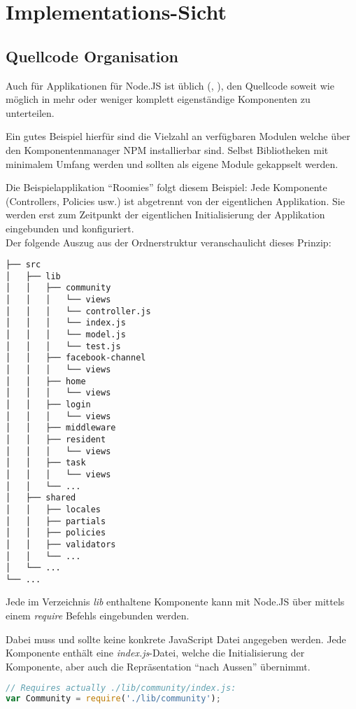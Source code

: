 \section{Implementations-Sicht}
\subsection{Quellcode Organisation}
Auch für Applikationen für Node.JS ist üblich (\cite{TJH_ComponentStructure}, \cite{IZS_ComponentStructure}), den Quellcode soweit wie möglich in mehr oder weniger komplett eigenständige Komponenten zu unterteilen.

Ein gutes Beispiel hierfür sind die Vielzahl an verfügbaren Modulen welche über den Komponentenmanager NPM \cite{NPM} installierbar sind. Selbst Bibliotheken mit minimalem Umfang werden und sollten als eigene Module gekappselt werden.

Die Beispielapplikation ``Roomies'' folgt diesem Beispiel: Jede Komponente (Controllers, Policies usw.) ist abgetrennt von der eigentlichen Applikation. Sie werden erst zum Zeitpunkt der eigentlichen Initialisierung der Applikation eingebunden und konfiguriert.\\[0.5mm]

Der folgende Auszug aus der Ordnerstruktur veranschaulicht dieses Prinzip:
\begin{verbatim}
├── src
│   ├── lib
│   │   ├── community
│   │   │   └── views
│   │   │   └── controller.js
│   │   │   └── index.js
│   │   │   └── model.js
│   │   │   └── test.js
│   │   ├── facebook-channel
│   │   │   └── views
│   │   ├── home
│   │   │   └── views
│   │   ├── login
│   │   │   └── views
│   │   ├── middleware
│   │   ├── resident
│   │   │   └── views
│   │   ├── task
│   │   │   └── views
│   │   └── ...
│   ├── shared
│   │   ├── locales
│   │   ├── partials
│   │   ├── policies
│   │   ├── validators
│   │   └── ...
│   └── ...
└── ...
\end{verbatim}

Jede im Verzeichnis \emph{lib} enthaltene Komponente kann mit Node.JS über mittels einem \emph{require} Befehls eingebunden werden.

Dabei muss und sollte keine konkrete JavaScript Datei angegeben werden. Jede Komponente enthält eine \emph{index.js}-Datei, welche die Initialisierung der Komponente, aber auch die Repräsentation ``nach Aussen'' übernimmt.

\begin{lstlisting}[language=JavaScript, caption=Einbindung der Community-Komponenten]
// Requires actually ./lib/community/index.js:
var Community = require('./lib/community');
\end{lstlisting}
